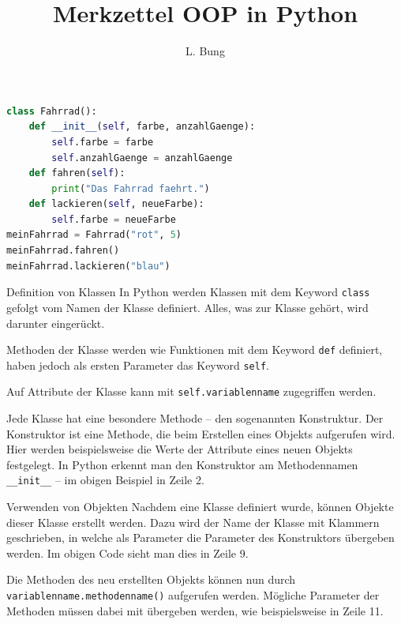 \documentclass[11pt, a4paper, oneside]{article}
\begin{document}
	\author{L. Bung}
	\title{Merkzettel \hspace{10cm} OOP in Python}
	\subject{SAE}
	\maketitle
	
	\begin{lstlisting}[language=python]
class Fahrrad():
    def __init__(self, farbe, anzahlGaenge):
        self.farbe = farbe
        self.anzahlGaenge = anzahlGaenge
    def fahren(self):
        print("Das Fahrrad faehrt.")
    def lackieren(self, neueFarbe):
        self.farbe = neueFarbe
meinFahrrad = Fahrrad("rot", 5)
meinFahrrad.fahren()
meinFahrrad.lackieren("blau")
	\end{lstlisting}

	\begin{hint}{Definition von Klassen}
		In Python werden Klassen mit dem Keyword \texttt{class} gefolgt vom Namen der Klasse definiert.
		Alles, was zur Klasse gehört, wird darunter eingerückt.
		
		Methoden der Klasse werden wie Funktionen mit dem Keyword \texttt{def} definiert, haben jedoch als ersten Parameter das Keyword \texttt{self}.
		
		Auf Attribute der Klasse kann mit \texttt{self.variablenname} zugegriffen werden.
		
		Jede Klasse hat eine besondere Methode -- den sogenannten Konstruktur.
		Der Konstruktor ist eine Methode, die beim Erstellen eines Objekts aufgerufen wird.
		Hier werden beispielsweise die Werte der Attribute eines neuen Objekts festgelegt.
		In Python erkennt man den Konstruktor am Methodennamen \texttt{\_\_init\_\_} -- im obigen Beispiel in Zeile 2.
	\end{hint}

	\begin{hint}{Verwenden von Objekten}
		Nachdem eine Klasse definiert wurde, können Objekte dieser Klasse erstellt werden.
		Dazu wird der Name der Klasse mit Klammern geschrieben, in welche als Parameter die Parameter des Konstruktors übergeben werden.
		Im obigen Code sieht man dies in Zeile 9.
		
		Die Methoden des neu erstellten Objekts können nun durch \texttt{variablenname.methodenname()} aufgerufen werden.
		Mögliche Parameter der Methoden müssen dabei mit übergeben werden, wie beispielsweise in Zeile 11.
	\end{hint}
	
\end{document}

